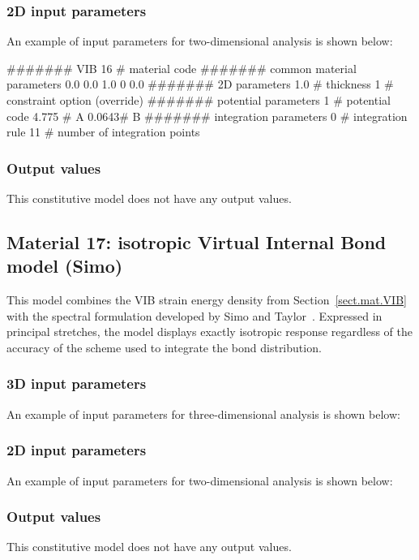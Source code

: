 \subsubsection{2D input parameters}
An example of input parameters for two-dimensional analysis is shown 
below:
\begin{inputfile}
####### VIB
16    # material code
####### common material parameters
0.0    0.0    1.0
0      0.0
####### 2D parameters
1.0   # thickness
1     # constraint option (override)
####### potential parameters
1     # potential code          
4.775 # A 
0.0643# B
####### integration parameters
0     # integration rule      
11    # number of integration points
\end{inputfile}

\subsubsection{Output values}
This constitutive model does not have any output values.

\subsection{Material 17: isotropic Virtual Internal Bond model (Simo)}
\label{sect.mat.VIB.Simo}
This model combines the VIB strain energy density from
Section~\ref{sect.mat.VIB} with the
spectral formulation developed by Simo and Taylor~\cite{Simo1991}.
Expressed in principal stretches, the model displays
exactly isotropic response regardless of the accuracy of the
scheme used to integrate the bond distribution.

\subsubsection{3D input parameters}
An example of input parameters for three-dimensional analysis is shown 
below:

\subsubsection{2D input parameters}
An example of input parameters for two-dimensional analysis is shown 
below:

\subsubsection{Output values}
This constitutive model does not have any output values.

